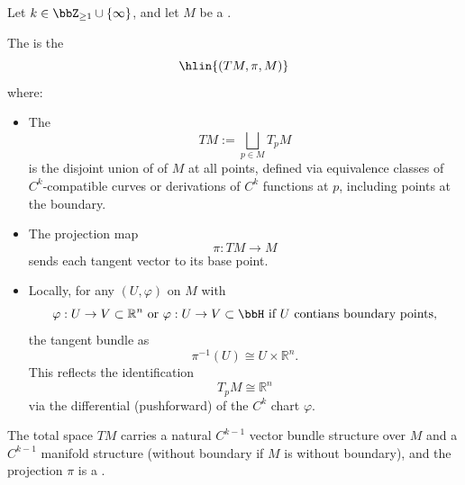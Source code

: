 \begin{definition} \label{definition:tangent_bundle_of_a_C_k_manifold}
  Let $k \in \bbZ_{\geq 1} \cup \{\infty\}$, and let $M$ be a .

  The  is the 
  $$\hlin{(TM, \pi, M)}$$
  where:
  \begin{itemize}
    \item The  
    $$ TM := \bigsqcup_{p \in M} T_p M $$
    is the disjoint union of  of $M$ at all points, defined via equivalence classes of $C^k$-compatible curves or derivations of $C^k$ functions at $p$, including points at the boundary.
    
    \item The projection map 
    $$ \pi : TM \to M $$
    sends each tangent vector to its base point.
    
    \item Locally, for any  $(U, \varphi)$ on $M$ with 
    $$ \varphi : U \to V \subset \mathbb{R}^n \text{ or } \varphi : U \to V \subset \bbH \text{ if } U \text{ contians boundary points}, $$
    the tangent bundle  as
    $$ \pi^{-1}(U) \cong U \times \mathbb{R}^n.  $$
    This reflects the identification 
    $$ T_p M \cong \mathbb{R}^n $$
    via the differential (pushforward) of the $C^k$ chart $\varphi$.
  \end{itemize}
  
  The total space $TM$ carries a natural $C^{k-1}$ vector  bundle structure over $M$ and  a $C^{k-1}$ manifold structure (without boundary if $M$ is without boundary), and the projection $\pi$ is a .
\end{definition}



